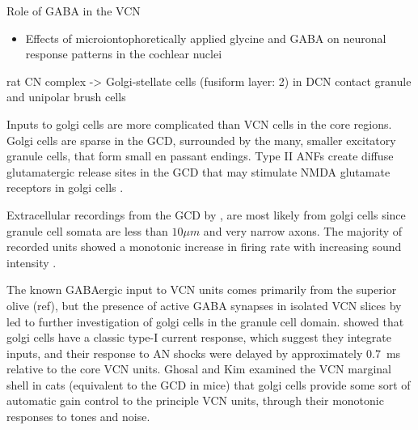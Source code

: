\medskip{}

Role of GABA in the VCN
\begin{itemize}
\item Effects of microiontophoretically applied glycine and {GABA} on
  neuronal response patterns in the cochlear nuclei
  \citep{CasparyHaveyEtAl:1979}
\end{itemize}

\citep{Alibardi:2003a} rat CN complex -> Golgi-stellate cells
(fusiform layer: 2) in DCN contact granule and unipolar brush cells

\medskip{}

Inputs to golgi cells are more complicated than VCN cells in the core
regions. Golgi cells are sparse in the GCD, surrounded by the many,
smaller excitatory granule cells, that form small en passant
endings. Type II ANFs create diffuse glutamatergic release sites in
the GCD \citep{HurdHutsonEtAl:1999,BensonBrown:2004} that may
stimulate NMDA glutamate receptors in golgi cells
\citep{FerragamoGoldingEtAl:1998a}.

\medskip{}

Extracellular recordings from the GCD by \citet{GhoshalKim:1997}, are
most likely from golgi cells since granule cell somata are less than
$10{}\mu{m}$ and very narrow axons. The majority of recorded units
showed a monotonic increase in firing rate with increasing sound
intensity \citep{GhoshalKim:1997}.

\medskip{}

The known GABAergic input to VCN units comes primarily from the
superior olive (ref), but the presence of active GABA synapses in
isolated VCN slices by \citet{FerragamoGoldingEtAl:1998} led to
further investigation of golgi cells in the granule cell
domain. \citet{FerragamoGoldingEtAl:1998a} showed that golgi cells
have a classic type-I current response, which suggest they integrate
inputs, and their response to AN shocks were delayed by approximately
0.7~ms relative to the core VCN units.  Ghosal and Kim
\citet{GhoshalKim:1997} examined the VCN marginal shell in cats
(equivalent to the GCD in mice) that golgi cells provide some sort of
automatic gain control to the principle VCN units, through their
monotonic responses to tones and noise.

\medskip{}

   
